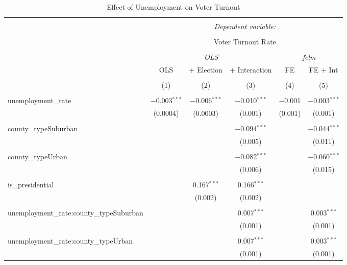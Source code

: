 
\begin{table}[!htbp] \centering 
  \caption{Effect of Unemployment on Voter Turnout} 
  \label{} 
\begin{tabular}{@{\extracolsep{5pt}}lccccc} 
\\[-1.8ex]\hline 
\hline \\[-1.8ex] 
 & \multicolumn{5}{c}{\textit{Dependent variable:}} \\ 
\cline{2-6} 
\\[-1.8ex] & \multicolumn{5}{c}{Voter Turnout Rate} \\ 
\\[-1.8ex] & \multicolumn{3}{c}{\textit{OLS}} & \multicolumn{2}{c}{\textit{felm}} \\ 
 & OLS & + Election & + Interaction & FE & FE + Int \\ 
\\[-1.8ex] & (1) & (2) & (3) & (4) & (5)\\ 
\hline \\[-1.8ex] 
 unemployment\_rate & $-$0.003$^{***}$ & $-$0.006$^{***}$ & $-$0.010$^{***}$ & $-$0.001 & $-$0.003$^{***}$ \\ 
  & (0.0004) & (0.0003) & (0.001) & (0.001) & (0.001) \\ 
  & & & & & \\ 
 county\_typeSuburban &  &  & $-$0.094$^{***}$ &  & $-$0.044$^{***}$ \\ 
  &  &  & (0.005) &  & (0.011) \\ 
  & & & & & \\ 
 county\_typeUrban &  &  & $-$0.082$^{***}$ &  & $-$0.060$^{***}$ \\ 
  &  &  & (0.006) &  & (0.015) \\ 
  & & & & & \\ 
 is\_presidential &  & 0.167$^{***}$ & 0.166$^{***}$ &  &  \\ 
  &  & (0.002) & (0.002) &  &  \\ 
  & & & & & \\ 
 unemployment\_rate:county\_typeSuburban &  &  & 0.007$^{***}$ &  & 0.003$^{***}$ \\ 
  &  &  & (0.001) &  & (0.001) \\ 
  & & & & & \\ 
 unemployment\_rate:county\_typeUrban &  &  & 0.007$^{***}$ &  & 0.003$^{***}$ \\ 
  &  &  & (0.001) &  & (0.001) \\ 

\end{tabular}
\end{table}
